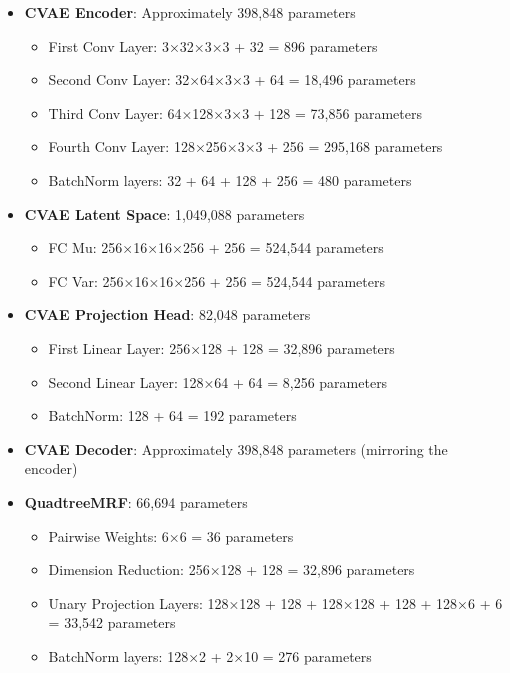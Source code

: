 \documentclass[conference]{IEEEtran}
\begin{document}
\begin{itemize}
    \item \textbf{CVAE Encoder}: Approximately 398,848 parameters
    \begin{itemize}
        \item First Conv Layer: 3×32×3×3 + 32 = 896 parameters
        \item Second Conv Layer: 32×64×3×3 + 64 = 18,496 parameters
        \item Third Conv Layer: 64×128×3×3 + 128 = 73,856 parameters
        \item Fourth Conv Layer: 128×256×3×3 + 256 = 295,168 parameters
        \item BatchNorm layers: 32 + 64 + 128 + 256 = 480 parameters
    \end{itemize}
    
    \item \textbf{CVAE Latent Space}: 1,049,088 parameters
    \begin{itemize}
        \item FC Mu: 256×16×16×256 + 256 = 524,544 parameters
        \item FC Var: 256×16×16×256 + 256 = 524,544 parameters
    \end{itemize}
    
    \item \textbf{CVAE Projection Head}: 82,048 parameters
    \begin{itemize}
        \item First Linear Layer: 256×128 + 128 = 32,896 parameters
        \item Second Linear Layer: 128×64 + 64 = 8,256 parameters
        \item BatchNorm: 128 + 64 = 192 parameters
    \end{itemize}
    
    \item \textbf{CVAE Decoder}: Approximately 398,848 parameters (mirroring the encoder)
    
    \item \textbf{QuadtreeMRF}: 66,694 parameters
    \begin{itemize}
        \item Pairwise Weights: 6×6 = 36 parameters
        \item Dimension Reduction: 256×128 + 128 = 32,896 parameters
        \item Unary Projection Layers: 128×128 + 128 + 128×128 + 128 + 128×6 + 6 = 33,542 parameters
        \item BatchNorm layers: 128×2 + 2×10 = 276 parameters
    \end{itemize}
\end{itemize}
\end{document}
